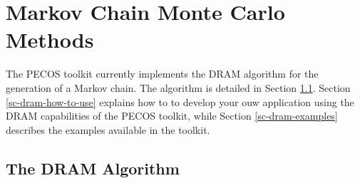 \chapter{Markov Chain Monte Carlo Methods}\label{ch-mcmc}
\thispagestyle{headings}

The PECOS toolkit currently implements the DRAM algorithm \cite{HaLaMiSa06} for the generation of a Markov chain.
The algorithm is detailed in Section \ref{sc-dram-alg}.
Section \ref{sc-dram-how-to-use} explains how to to develop your ouw application using the DRAM capabilities of the PECOS toolkit, while
Section \ref{sc-dram-examples} describes the examples available in the toolkit.

\section{The DRAM Algorithm}\label{sc-dram-alg}

